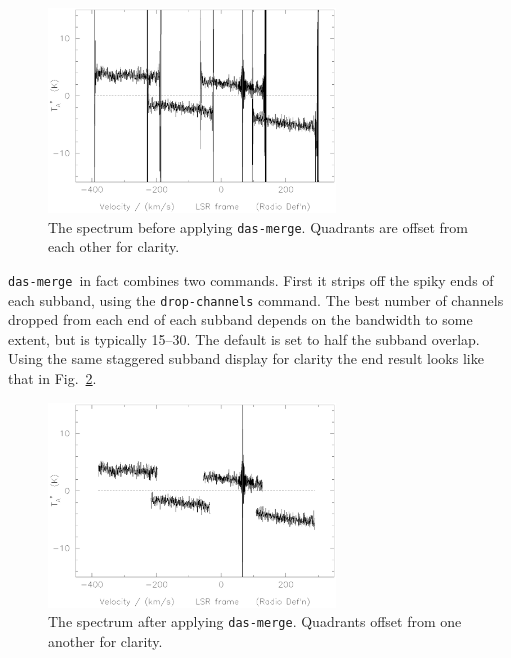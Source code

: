 \documentclass[11pt,twoside]{article}
\newcommand{\dm}{{\tt das-merge}}
\begin{document}
\begin{figure}[ht]
\begin{minipage}[t]{\textwidth}
\begin{minipage}[b]{0.5\textwidth}
\centering
\includegraphics[width=3.0in]{sc8_dm_orig.ps}
\end{minipage}
\hfill
\begin{minipage}[b]{0.45\textwidth}
\caption[Before {\tt das-merge}]
{\small{The spectrum before applying {\tt das-merge}. Quadrants are
offset from each other for clarity.
\vspace*{2cm}
}}
\label{fig:before-das-merge}
\end{minipage}
\end{minipage}
\end{figure}

\dm\ in fact combines two commands. First it strips off the spiky ends of each
subband, using the {\tt drop-channels} command. The best number of
channels dropped from each end of each subband depends on the
bandwidth to some extent, but is typically 15--30. The default is set
to half the subband overlap. Using the same staggered subband display
for clarity the end result looks like that in Fig.~\ref{fig:after-das-merge}.

\begin{figure}[ht]
\begin{minipage}[t]{\textwidth}
\begin{minipage}[b]{0.5\textwidth}
\centering
\includegraphics[width=3.0in]{sc8_dm_drop.ps}
\end{minipage}
\hfill
\begin{minipage}[b]{0.45\textwidth}
\caption[After {\tt das-merge}]
{\small{The spectrum after applying {\tt das-merge}. Quadrants offset
from one another for clarity.
\vspace*{2cm}
}}
\label{fig:after-das-merge}
\end{minipage}
\end{minipage}
\end{figure}
\end{document}
